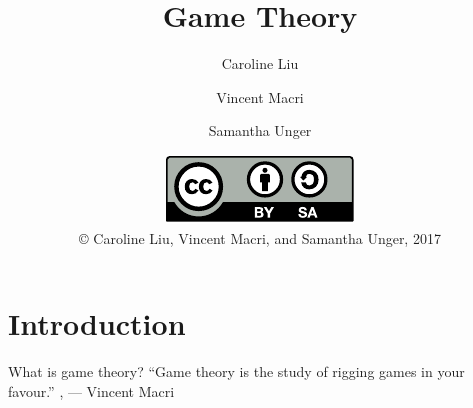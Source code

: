 

\usepackage{skull}
\usepackage{tikz}
\usepackage{forest}

\title{Game Theory}
\author{Caroline Liu \and Vincent Macri \and Samantha Unger}
\date{\includegraphics{../LicenseLogo}\\\copyright{} Caroline Liu, Vincent Macri, and Samantha Unger, 2017}

\newcommand{\emoji}[1]{\raisebox{-0.25\baselineskip}{\texttt{[image: \#1]}}}




	\frame{\titlepage}
	\section{Introduction}
	\begin{namedframe}{What is game theory?}
		``Game theory is the study of rigging games in your favour.''
		\sep
		\flushright
		--- Vincent Macri
	\end{namedframe}
	
	
	

